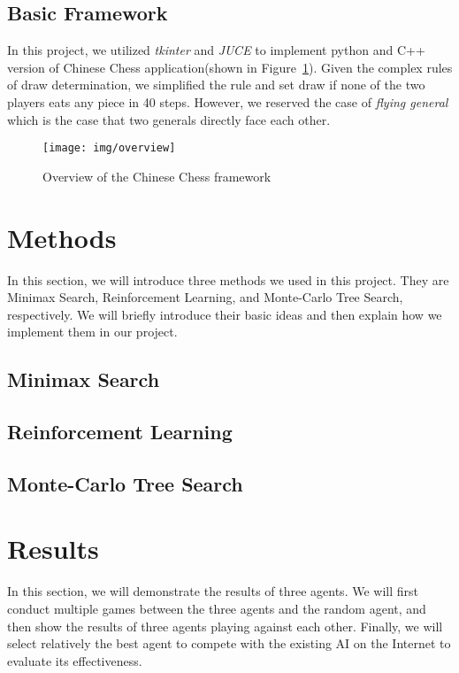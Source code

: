 \documentclass[letterpaper]{article}
\begin{document}
    \subsection{Basic Framework}\label{subsec:framework}
    In this project, we utilized \emph{tkinter} and \emph{JUCE} to implement python and C++ version of Chinese Chess application(shown in Figure~\ref{fig:figure}).
    Given the complex rules of draw determination, we simplified the rule and set draw if none of the two players eats any piece in 40 steps.
    However, we reserved the case of \emph{flying general} which is the case that two generals directly face each other.
    \begin{figure}
        \centering
        \texttt{[image: img/overview]}
        \caption{Overview of the Chinese Chess framework}\label{fig:figure}
    \end{figure}
    \section{Methods}\label{sec:methods}

In this section, we will introduce three methods we used in this project.
They are Minimax Search, Reinforcement Learning, and Monte-Carlo Tree Search, respectively.
We will briefly introduce their basic ideas and then explain how we implement them in our project.

\subsection{Minimax Search}\label{subsec:minimax-search}


\subsection{Reinforcement Learning}\label{subsec:reinforcement-learning}


\subsection{Monte-Carlo Tree Search}
\label{subsec:monte-carlo-tree-search}



\section{Results}\label{sec:results}
In this section, we will demonstrate the results of three agents.
We will first conduct multiple games between the three agents and the random agent, and then show the results of three agents playing against each other.
Finally, we will select relatively the best agent to compete with the existing AI on the Internet to evaluate its effectiveness.
\end{document}
